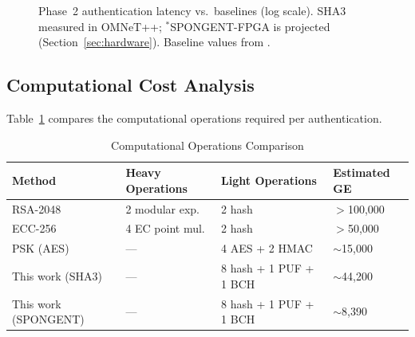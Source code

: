 \documentclass[11pt,a4paper]{article}
\begin{document}
\begin{figure}[H]
\centering
{}
\caption{Phase~2 authentication latency vs.\ baselines (log scale). SHA3 measured in OMNeT++; $^*$SPONGENT-FPGA is projected (Section~\ref{sec:hardware}). Baseline values from \cite{peer2peer_auth, puf_lightweight_uav, puf_uav_cross_domain, puf_6g_uav}.}
\label{fig:latency_bar}
\end{figure}

\subsection{Computational Cost Analysis}

Table~\ref{tab:compute_comparison} compares the computational operations required per authentication.

\begin{table}[H]
\centering
\caption{Computational Operations Comparison}
\label{tab:compute_comparison}
\begin{tabular}{@{}lp{2cm}p{2cm}p{2cm}@{}}
\toprule
\textbf{Method} & \textbf{Heavy Operations} & \textbf{Light Operations} & \textbf{Estimated GE} \\
\midrule
RSA-2048 & 2 modular exp. & 2 hash & $>$100,000 \\
ECC-256 & 4 EC point mul. & 2 hash & $>$50,000 \\
PSK (AES) & --- & 4 AES + 2 HMAC & $\sim$15,000 \\
This work (SHA3) & --- & 8 hash + 1 PUF + 1 BCH & $\sim$44,200 \\
This work (SPONGENT) & --- & 8 hash + 1 PUF + 1 BCH & $\sim$8,390 \\
\bottomrule
\end{tabular}
\end{table}
\end{document}
